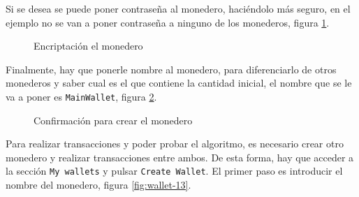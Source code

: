 Si se desea se puede poner contraseña al monedero, haciéndolo más seguro, en el ejemplo no se van a poner contraseña a ninguno de los monederos, figura \ref{fig:wallet-9}.\\

\begin{figure}[H]
	\centering
	\caption{Encriptación el monedero}
	\label{fig:wallet-9}
\end{figure}

Finalmente, hay que ponerle nombre al monedero, para diferenciarlo de otros monederos y saber cual es el que contiene la cantidad inicial, el nombre que se le va a poner es \texttt{MainWallet}, figura \ref{fig:wallet-10}.\\

\begin{figure}[H]
	\centering
	\caption{Confirmación para crear el monedero}
	\label{fig:wallet-10}
\end{figure}



\newpage
Para realizar transacciones y poder probar el algoritmo, es necesario crear otro monedero y realizar transacciones entre ambos. De esta forma, hay que acceder a la sección \texttt{My wallets} y pulsar \texttt{Create Wallet}. El primer paso es introducir el nombre del monedero, figura \ref{fig:wallet-13}.\\
 
